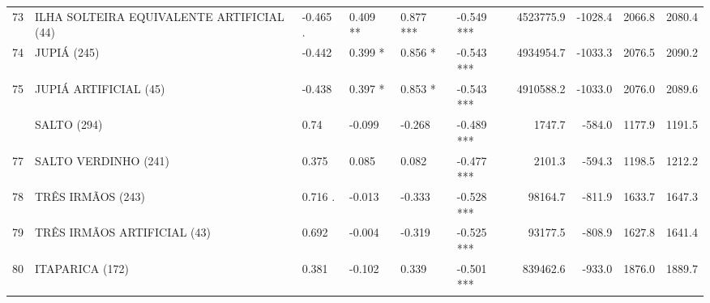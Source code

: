 \documentclass[12pt,oneside]{book}\usepackage[]{graphicx}\usepackage[]{color}
\newenvironment{knitrout}{}{} %
\theoremstyle{definition} %
\begin{document}
\begin{knitrout}
\begin{table}
{\begin{tabular}[t]{llllllrrrr}
\rowcolor{gray!6}  73 & ILHA SOLTEIRA EQUIVALENTE ARTIFICIAL (44) & -0.465 . & 0.409 ** & 0.877 *** & -0.549 *** & 4523775.9 & -1028.4 & 2066.8 & 2080.4\\
74 & JUPIÁ (245) & -0.442 & 0.399 * & 0.856 * & -0.543 *** & 4934954.7 & -1033.3 & 2076.5 & 2090.2\\
\rowcolor{gray!6}  75 & JUPIÁ ARTIFICIAL (45) & -0.438 & 0.397 * & 0.853 * & -0.543 *** & 4910588.2 & -1033.0 & 2076.0 & 2089.6\\
\addlinespace
76 & SALTO (294) & 0.74 & -0.099 & -0.268 & -0.489 *** & 1747.7 & -584.0 & 1177.9 & 1191.5\\
\rowcolor{gray!6}  77 & SALTO VERDINHO (241) & 0.375 & 0.085 & 0.082 & -0.477 *** & 2101.3 & -594.3 & 1198.5 & 1212.2\\
78 & TRÊS IRMÃOS (243) & 0.716 . & -0.013 & -0.333 & -0.528 *** & 98164.7 & -811.9 & 1633.7 & 1647.3\\
\rowcolor{gray!6}  79 & TRÊS IRMÃOS ARTIFICIAL (43) & 0.692 & -0.004 & -0.319 & -0.525 *** & 93177.5 & -808.9 & 1627.8 & 1641.4\\
80 & ITAPARICA (172) & 0.381 & -0.102 & 0.339 & -0.501 *** & 839462.6 & -933.0 & 1876.0 & 1889.7\\
\bottomrule
\end{tabular}}
\end{table}


\end{knitrout}
\end{document}
